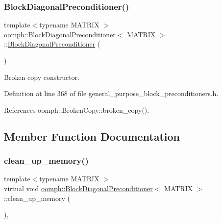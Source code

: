 \subsubsection{\texorpdfstring{Block\+Diagonal\+Preconditioner()}{BlockDiagonalPreconditioner()}\hspace{0.1cm}{\footnotesize\ttfamily [2/2]}}
{\footnotesize\ttfamily template$<$typename M\+A\+T\+R\+IX $>$ \\
\hyperlink{classoomph_1_1BlockDiagonalPreconditioner}{oomph\+::\+Block\+Diagonal\+Preconditioner}$<$ M\+A\+T\+R\+IX $>$\+::\hyperlink{classoomph_1_1BlockDiagonalPreconditioner}{Block\+Diagonal\+Preconditioner} (\begin{DoxyParamCaption}\item[{const \hyperlink{classoomph_1_1BlockDiagonalPreconditioner}{Block\+Diagonal\+Preconditioner}$<$ M\+A\+T\+R\+IX $>$ \&}]{ }\end{DoxyParamCaption})\hspace{0.3cm}{\ttfamily [inline]}}



Broken copy constructor. 



Definition at line 368 of file general\+\_\+purpose\+\_\+block\+\_\+preconditioners.\+h.



References oomph\+::\+Broken\+Copy\+::broken\+\_\+copy().



\subsection{Member Function Documentation}
\mbox{\label{classoomph_1_1BlockDiagonalPreconditioner_aced1bed34b9f6a11903d5fd3ae42ece8}} 
\subsubsection{\texorpdfstring{clean\+\_\+up\+\_\+memory()}{clean\_up\_memory()}}
{\footnotesize\ttfamily template$<$typename M\+A\+T\+R\+IX $>$ \\
virtual void \hyperlink{classoomph_1_1BlockDiagonalPreconditioner}{oomph\+::\+Block\+Diagonal\+Preconditioner}$<$ M\+A\+T\+R\+IX $>$\+::clean\+\_\+up\+\_\+memory (\begin{DoxyParamCaption}{ }\end{DoxyParamCaption})\hspace{0.3cm}{\ttfamily [inline]}, {\ttfamily [virtual]}}



